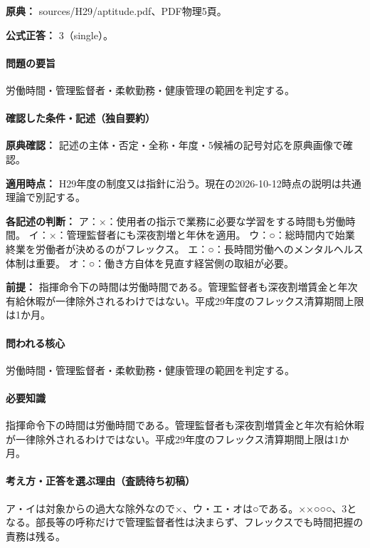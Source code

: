 \noindent\textbf{原典：} sources/H29/aptitude.pdf、PDF物理5頁。

\textbf{公式正答：} 3（single）。

\paragraph{問題の要旨} 労働時間・管理監督者・柔軟勤務・健康管理の範囲を判定する。

\paragraph{確認した条件・記述（独自要約）}\mbox{}\par

\noindent\textbf{原典確認：} 記述の主体・否定・全称・年度・5候補の記号対応を原典画像で確認。\par

\noindent\textbf{適用時点：} H29年度の制度又は指針に沿う。現在の2026-10-12時点の説明は共通理論で別記する。\par

\noindent\textbf{各記述の判断：} ア：×：使用者の指示で業務に必要な学習をする時間も労働時間。 イ：×：管理監督者にも深夜割増と年休を適用。 ウ：○：総時間内で始業終業を労働者が決めるのがフレックス。 エ：○：長時間労働へのメンタルヘルス体制は重要。 オ：○：働き方自体を見直す経営側の取組が必要。\par

\noindent\textbf{前提：} 指揮命令下の時間は労働時間である。管理監督者も深夜割増賃金と年次有給休暇が一律除外されるわけではない。平成29年度のフレックス清算期間上限は1か月。\par

\paragraph{問われる核心} 労働時間・管理監督者・柔軟勤務・健康管理の範囲を判定する。

\paragraph{必要知識} 指揮命令下の時間は労働時間である。管理監督者も深夜割増賃金と年次有給休暇が一律除外されるわけではない。平成29年度のフレックス清算期間上限は1か月。

\paragraph{考え方・正答を選ぶ理由（査読待ち初稿）} ア・イは対象からの過大な除外なので×、ウ・エ・オは○である。××○○○、3となる。部長等の呼称だけで管理監督者性は決まらず、フレックスでも時間把握の責務は残る。

